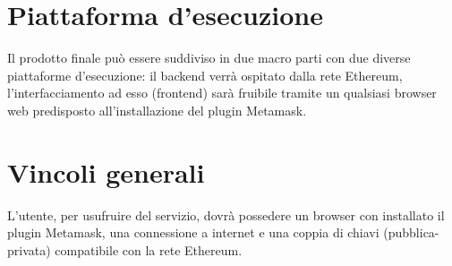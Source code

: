 \documentclass[AnalisiDeiRequisiti.tex]{subfiles}
\begin{document}
\section{Piattaforma d'esecuzione}
Il prodotto finale può essere suddiviso in due macro parti con due diverse piattaforme d'esecuzione: il backend verrà ospitato dalla rete Ethereum, l'interfacciamento ad esso (frontend) sarà fruibile tramite un qualsiasi browser web predisposto all'installazione del plugin Metamask.
\section{Vincoli generali}
L'utente, per usufruire del servizio, dovrà possedere un browser con installato il plugin Metamask, una connessione a internet e una coppia di chiavi (pubblica-privata) compatibile con la rete Ethereum.	
\end{document}
